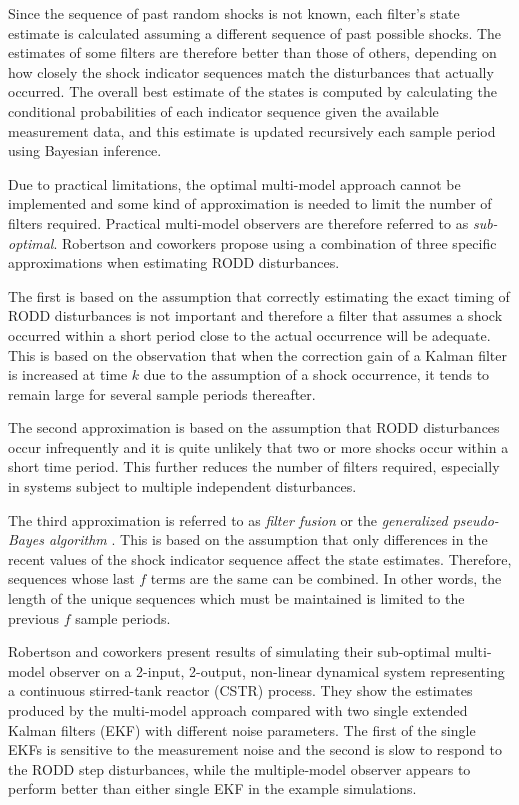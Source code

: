 Since the sequence of past random shocks is not known, each filter's state estimate is calculated assuming a different sequence of past possible shocks. The estimates of some filters are therefore better than those of others, depending on how closely the shock indicator sequences match the disturbances that actually occurred. The overall best estimate of the states is computed by calculating the conditional probabilities of each indicator sequence given the available measurement data, and this estimate is updated recursively each sample period using Bayesian inference.

Due to practical limitations, the optimal multi-model approach cannot be implemented and some kind of approximation is needed to limit the number of filters required. Practical multi-model observers are therefore referred to as \textit{sub-optimal}. Robertson and coworkers propose using a combination of three specific approximations when estimating RODD disturbances.

The first is based on the assumption that correctly estimating the exact timing of RODD disturbances is not important and therefore a filter that assumes a shock occurred within a short period close to the actual occurrence will be adequate. This is based on the observation that when the correction gain of a Kalman filter is increased at time $k$ due to the assumption of a shock occurrence, it tends to remain large for several sample periods thereafter.

The second approximation is based on the assumption that RODD disturbances occur infrequently and it is quite unlikely that two or more shocks occur within a short time period. This further reduces the number of filters required, especially in systems subject to multiple independent disturbances.

The third approximation is referred to as \textit{filter fusion} or the \textit{generalized pseudo-Bayes algorithm} \cite{jaffer_estimation_1971, buxbaum_recursive_1970, tugnait_detection_1982}. This is based on the assumption that only differences in the recent values of the shock indicator sequence affect the state estimates. Therefore, sequences whose last $f$ terms are the same can be combined. In other words, the length of the unique sequences which must be maintained is limited to the previous $f$ sample periods.

Robertson and coworkers present results of simulating their sub-optimal multi-model observer on a 2-input, 2-output, non-linear dynamical system representing a continuous stirred-tank reactor (CSTR) process. They show the estimates produced by the multi-model approach compared with two single extended Kalman filters (EKF) with different noise parameters. The first of the single EKFs is sensitive to the measurement noise and the second is slow to respond to the RODD step disturbances, while the multiple-model observer appears to perform better than either single EKF in the example simulations.

